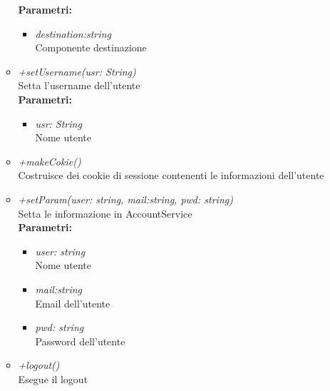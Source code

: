 \begin{itemize}
\begin{itemize}
    		\textbf{Parametri:}
    		\begin{itemize}
    			\item \emph{destination:string}\\
    			Componente destinazione
    		\end{itemize}
    		\item \emph{+setUsername(usr: String)}\\
    		Setta l'username dell'utente\\
    		\textbf{Parametri:}
    		\begin{itemize}
    			\item \emph{usr: String}\\
    			Nome utente
    		\end{itemize}
    		\item \emph{+makeCokie()}\\
    		Costruisce dei cookie di sessione contenenti le informazioni dell'utente
    		\item \emph{+setParam(user: string, mail:string, pwd: string)}\\
    		Setta le informazione in AccountService\\
    		\textbf{Parametri:}
    		\begin{itemize}
    			\item \emph{user: string}\\
    			Nome utente
    			\item \emph{mail:string}\\
    			Email dell'utente
    			\item \emph{pwd: string}\\
    			Password dell'utente
    		\end{itemize}
    		\item \emph{+logout()}\\
    		Esegue il logout
		\end{itemize}
\end{itemize}